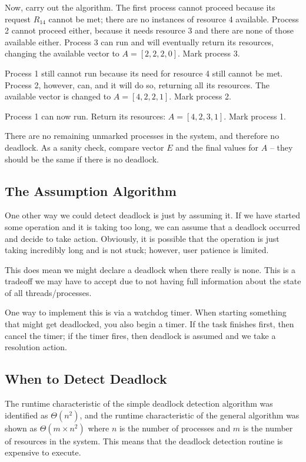 Now, carry out the algorithm. The first process cannot proceed because its request $R_{14}$ cannot be met; there are no instances of resource 4 available. Process 2 cannot proceed either, because it needs resource 3 and there are none of those available either. Process 3 can run and will eventually return its resources, changing the available vector to $A = [2, 2, 2, 0]$. Mark process 3.

Process 1 still cannot run because its need for resource 4 still cannot be met. Process 2, however, can, and it will do so, returning all its resources. The available vector is changed to $A = [4, 2, 2, 1]$. Mark process 2.

Process 1 can now run. Return its resources: $A = [4, 2, 3, 1]$. Mark process 1.

There are no remaining unmarked processes in the system, and therefore no deadlock. As a sanity check, compare vector $E$ and the final values for $A$ -- they should be the same if there is no deadlock.

\subsection*{The Assumption Algorithm}

One other way we could detect deadlock is just by assuming it. If we have started some operation and it is taking too long, we can assume that a deadlock occurred and decide to take action. Obviously, it is possible that the operation is just taking incredibly long and is not stuck; however, user patience is limited. 

This does mean we might declare a deadlock when there really is none. This is a tradeoff we may have to accept due to not having full information about the state of all threads/processes.

One way to implement this is via a watchdog timer. When starting something that might get deadlocked, you also begin a timer. If the task finishes first, then cancel the timer; if the timer fires, then deadlock is assumed and we take a resolution action.

\subsection*{When to Detect Deadlock}
The runtime characteristic of the simple deadlock detection algorithm was identified as $\Theta(n^{2})$, and the runtime characteristic of the general algorithm was shown as $\Theta(m \times n^{2})$ where $n$ is the number of processes and $m$ is the number of resources in the system. This means that the deadlock detection routine is expensive to execute.

